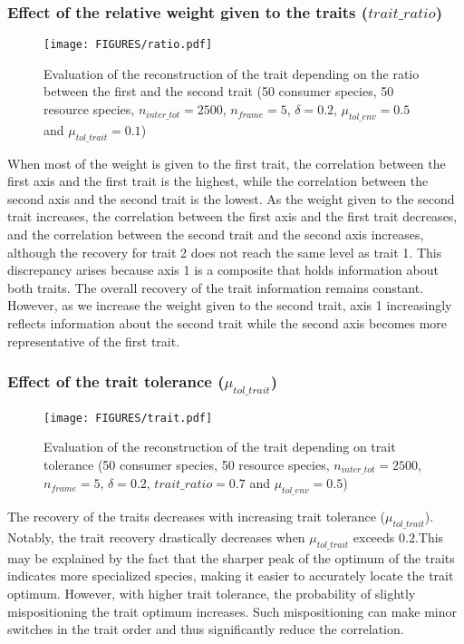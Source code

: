 \subsubsection{Effect of the relative weight given to the traits ($trait\_ratio$)}

\begin{figure}[H]
    \centering
    \texttt{[image: FIGURES/ratio.pdf]}  %
    \caption{Evaluation of the reconstruction of the trait depending on the ratio between the first and the second trait (50 consumer species, 50 resource species, $n_{inter\_tot} = 2500$, $n_{frame} = 5$, $\delta =  0.2$, $\mu_{tol\_env} = 0.5$ and $\mu_{tol\_trait} = 0.1$)}
    \label{fig:trait_ratio}
\end{figure}

When most of the weight is given to the first trait, the correlation between the first axis and the first trait is the highest, while the correlation between the second axis and the second trait is the lowest. As the weight given to the second trait increases, the correlation between the first axis and the first trait decreases, and the correlation between the second trait and the second axis increases, although the recovery for trait 2 does not reach the same level as trait 1. This discrepancy arises because axis 1 is a composite that holds information about both traits. The overall recovery of the trait information remains constant. However, as we increase the weight given to the second trait, axis 1 increasingly reflects information about the second trait while the second axis becomes more representative of the first trait.


\subsubsection{Effect of the trait tolerance ($\mu_{tol\_trait}$)}

\begin{figure}[H]
    \centering
    \texttt{[image: FIGURES/trait.pdf]}
    \caption{Evaluation of the reconstruction of the trait depending on trait tolerance (50 consumer species, 50 resource species, $n_{inter\_tot} = 2500$, $n_{frame} = 5$, $\delta =  0.2$, $trait\_ratio = 0.7$ and $\mu_{tol\_env} = 0.5$)}
    \label{fig:tol_trait}
\end{figure}

The recovery of the traits decreases with increasing trait tolerance ($\mu_{tol\_trait}$). Notably, the trait recovery drastically decreases when $\mu_{tol\_trait}$ exceeds  $0.2$.This may be explained by the fact that the sharper peak of the optimum of the traits indicates more specialized species, making it easier to accurately locate the trait optimum. However, with higher trait tolerance, the probability of slightly mispositioning the trait optimum increases. Such mispositioning can make minor switches in the trait order and thus significantly reduce the correlation.



